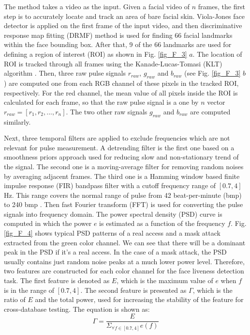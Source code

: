\documentclass[journal]{IEEEtran}
\begin{document}
The method takes a video as the input. Given a facial video of $n$ frames, the first step is to accurately locate and track an area of bare facial skin.  Viola-Jones face detector \cite{viola2001rapid} is applied on the first frame of the input video, and then discriminative response map fitting (DRMF) method \cite{asthana2013robust} is used for finding 66 facial landmarks within the face bounding box. After that,  9 of the 66 landmarks are used for defining a region of interest (ROI) as shown in Fig. \ref{fig_F_3} $a$. The location of ROI is tracked through all frames using the Kanade-Lucas-Tomasi (KLT) algorithm \cite{tomasi1991detection}. Then, three raw pulse signals $r_{raw}$, $g_{raw}$ and $b_{raw}$ (see Fig. \ref{fig_F_3} $b$) are computed one from each RGB channel of these pixels in the tracked ROI, respectively.  For the red channel, the mean value of all pixels inside the ROI is calculated for each frame, so that the raw pulse signal is a one by $n$ vector $r_{raw} = [r_1 , r_2 , . . . , r_n]$. The two other raw signals $g_{raw}$ and $b_{raw}$ are computed similarly.


Next, three temporal filters are applied to exclude frequencies which are not relevant for pulse measurement. A detrending filter is the first one based on a smoothness priors approach \cite{tarvainen2002advanced} used for reducing slow and non-stationary trend of the signal. The second one is a moving-average filter for removing random noises by averaging adjacent frames. The third one is a Hamming window based finite impulse response (FIR) bandpass filter with a cutoff frequency range of $[0.7, 4]$ Hz. This range covers the normal range of pulse from 42 beat-per-minute (bmp) to 240 bmp \cite{poh2011advancements}. Then fast Fourier transform (FFT) is used for converting the pulse signals into frequency domain. The power spectral density (PSD) curve is computed in which the power $e$ is estimated as a function of the frequency $f$. Fig. \ref{fig_F_4} shows typical PSD patterns of a real access and a mask attack extracted from the green color channel. We can see that there will be a dominant peak in the PSD if it's a real access. In the case of a mask attack, the PSD usually contains just  random noise peaks at a much lower power level. Therefore, two features are constructed for each color channel for the face liveness detection task. The first feature is denoted as $E$, which is the maximum value of $e$ when $f$ is in the range of $[0.7, 4]$. The second feature is presented as $\Gamma$, which is the ratio of $E$ and the total power, used for increasing the stability of the feature for cross-database testing. The equation is shown as:
\begin{equation}
\label{eq_F_1}
\Gamma = \dfrac{E}{{\Sigma }_{\forall f\in \left[0.7,4\right]}e\left(f\right)}
\end{equation}
\end{document}
